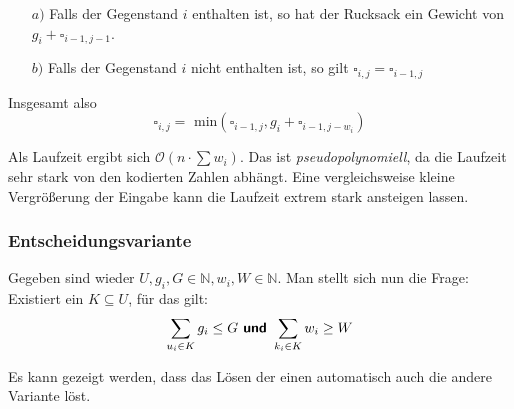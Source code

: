 \documentclass{scrartcl}%
\begin{document}
    \begin{itemize}
        \item [$a)$] Falls der Gegenstand $i$ enthalten ist, so hat der Rucksack ein Gewicht von $g_{i} + \square_{i-1,j-1}$.
        \item [$b)$] Falls der Gegenstand $i$ nicht enthalten ist, so gilt $\square_{i,j} = \square_{i-1, j}$
    \end{itemize}

    Insgesamt also
    \begin{equation*}
        \square_{i,j} = \text{ min}(\square_{i-1,j}, g_i + \square_{i-1,j-w_i})
    \end{equation*}

    Als Laufzeit ergibt sich $\mathcal{O}(n \cdot \sum w_i)$.
    Das ist \textit{pseudopolynomiell}, da die Laufzeit sehr stark von den kodierten Zahlen abhängt.
    Eine vergleichsweise kleine Vergrößerung der Eingabe kann die Laufzeit extrem stark ansteigen lassen.

    \subsubsection*{Entscheidungsvariante}
    Gegeben sind wieder $U, g_i, G \in \mathbb{N}, w_i, W \in \mathbb{N}$. Man stellt sich nun die Frage: Existiert ein $K \subseteq U$, für das gilt:
    \begin{equation*}
        \sum_{u_i \in K} g_i \leq G \text{\textbf{\textsf{ und }}} \sum_{k_i \in K} w_i \geq W
    \end{equation*}

    \vspace*{0.3cm}
    Es kann gezeigt werden, dass das Lösen der einen automatisch auch die andere Variante löst.
\end{document}
